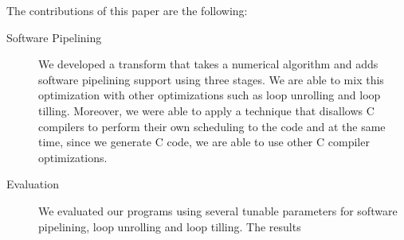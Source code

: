 \documentclass[10pt]{article}
\begin{document}
The contributions of this paper are the following:

\begin{description}
   \item[Software Pipelining] We developed a transform that takes a numerical algorithm and adds software pipelining support
   using three stages. We are able to mix this optimization with other optimizations such as loop unrolling and loop tilling.
   Moreover, we were able to apply a technique that disallows C compilers to perform their own scheduling to the code and at
   the same time, since we generate C code, we are able to use other C compiler optimizations. 
   \item[Evaluation] We evaluated our programs using several tunable parameters for software pipelining,
   loop unrolling and loop tilling. The results
\end{description}

\begin{comment}
+( ) A general technique(hack) for forcing schedules in C
+( ) An implemented set of rules in SPIRAL for tunable software pipelining.
+( ) And as a result, potentially faster code that is generated by SPIRAL that is
  comparable to an expert.
\end{comment}

\begin{comment}
   Given a loop described at the ICode level we want to do three things:
   0. Apply a transformation to turn it into a 3 software pipelined loops
   (prologue, steady state, and epilogue). The prologue and the epilogue
   space out computation as best as possible while preserving ordering. And
   the steady state mirrors the original loop in terms of the order of
   instructions, but the elements that each instruction is operating on are
   from different loop iterations.

   1. We want unroll all 3 of the loops. We do this because we don't want
   to deal with register allocation (this would involve implementing
   iterative-modulo scheduling), we would rather let the compiler figure
   out the allocations instead. As a bonus, we drop the loop overhead.

   2. Then we want to instrument those instructions with labels from goto
   statements, so we can force the schedule. By placing a label between
   each instruction and making the control flow unpredictable at compile
   time, the compiler is forced to preserve this schedule.
\end{comment}
\end{document}

